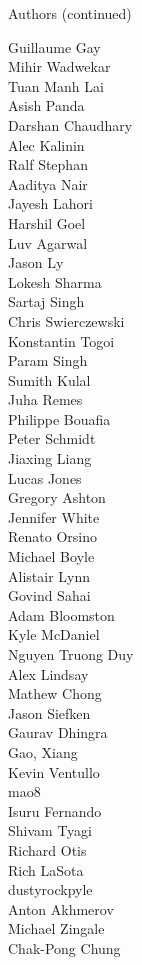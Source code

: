 \begin{frame}{Authors (continued)}
\begin{multicols}{5}
Guillaume Gay\\
Mihir Wadwekar\\
Tuan Manh Lai\\
Asish Panda\\
Darshan Chaudhary\\
Alec Kalinin\\
Ralf Stephan\\
Aaditya Nair\\
Jayesh Lahori\\
Harshil Goel\\
Luv Agarwal\\
Jason Ly\\
Lokesh Sharma\\
Sartaj Singh\\
Chris Swierczewski\\
Konstantin Togoi\\
Param Singh\\
Sumith Kulal\\
Juha Remes\\
Philippe Bouafia\\
Peter Schmidt\\
Jiaxing Liang\\
Lucas Jones\\
Gregory Ashton\\
Jennifer White\\
Renato Orsino\\
Michael Boyle\\
Alistair Lynn\\
Govind Sahai\\
Adam Bloomston\\
Kyle McDaniel\\
Nguyen Truong Duy\\
Alex Lindsay\\
Mathew Chong\\
Jason Siefken\\
Gaurav Dhingra\\
Gao, Xiang\\
Kevin Ventullo\\
mao8\\
Isuru Fernando\\
Shivam Tyagi\\
Richard Otis\\
Rich LaSota\\
dustyrockpyle\\
Anton Akhmerov\\
Michael Zingale\\
Chak-Pong Chung\\

\end{multicols}
\end{frame}
